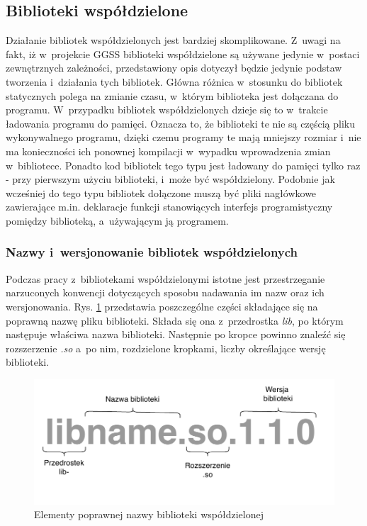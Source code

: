 
\subsection{Biblioteki współdzielone}
Działanie bibliotek współdzielonych jest bardziej skomplikowane. Z~uwagi na fakt, iż w~projekcie GGSS biblioteki współdzielone są używane jedynie w~postaci zewnętrznych zależności, przedstawiony opis dotyczył będzie jedynie podstaw tworzenia i~działania tych bibliotek. Główna różnica w~stosunku do bibliotek statycznych polega na zmianie czasu, w~którym biblioteka jest dołączana do programu. W~przypadku bibliotek współdzielonych dzieje się to w~trakcie ładowania programu do pamięci. Oznacza to, że biblioteki te nie są częścią pliku wykonywalnego programu, dzięki czemu programy te mają mniejszy rozmiar i~nie ma konieczności ich ponownej kompilacji w~wypadku wprowadzenia zmian w~bibliotece. Ponadto kod bibliotek tego typu jest ładowany do pamięci tylko raz - przy pierwszym użyciu biblioteki, i~może być współdzielony. Podobnie jak wcześniej do tego typu bibliotek dołączone muszą być pliki nagłówkowe zawierające m.in. deklaracje funkcji stanowiących interfejs programistyczny pomiędzy biblioteką, a~używającym ją programem.

\newpage

\subsubsection*{Nazwy i~wersjonowanie bibliotek współdzielonych}
Podczas pracy z~bibliotekami współdzielonymi istotne jest przestrzeganie narzuconych konwencji dotyczących sposobu nadawania im nazw oraz ich wersjonowania. Rys. \ref{fig:sharedName} przedstawia poszczególne części składające się na poprawną nazwę pliku biblioteki. Składa się ona z~przedrostka \textit{lib}, po którym następuje właściwa nazwa biblioteki. Następnie po kropce powinno znaleźć się rozszerzenie \textit{.so} a~po nim, rozdzielone kropkami, liczby określające wersję biblioteki. 

\begin{figure}[H]
\centering
\caption{Elementy poprawnej nazwy biblioteki współdzielonej}
\label{fig:sharedName}
\includegraphics[width=\textwidth]{res/sharedLibName}
\end{figure}

